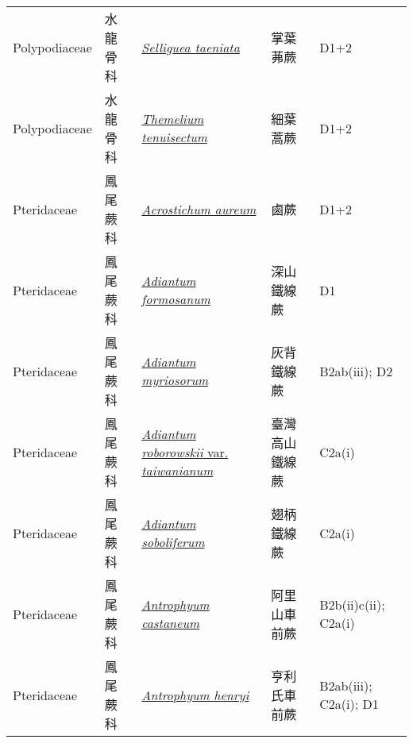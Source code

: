 {\begin{longtable}{p{2.5cm}p{2.5cm}p{4.5cm}p{2.5cm}p{3cm}}
    Polypodiaceae & 水龍骨科 & \href{http://www.theplantlist.org/tpl1.1/search?q=Selliguea+taeniata}{\textit{Selliguea taeniata} } & 掌葉茀蕨 & D1+2 \index{Selliguea@\textit{Selliguea}!taeniata@\textit{taeniata}}  \index{掌葉茀蕨} \\
    Polypodiaceae & 水龍骨科 & \href{http://www.theplantlist.org/tpl1.1/search?q=Themelium+tenuisectum}{\textit{Themelium tenuisectum} } & 細葉蒿蕨 & D1+2 \index{Themelium@\textit{Themelium}!tenuisectum@\textit{tenuisectum}}  \index{細葉蒿蕨} \\
    Pteridaceae & 鳳尾蕨科 & \href{http://www.theplantlist.org/tpl1.1/search?q=Acrostichum+aureum}{\textit{Acrostichum aureum} } & 鹵蕨 & D1+2 \index{Acrostichum@\textit{Acrostichum}!aureum@\textit{aureum}}  \index{鹵蕨} \\
    Pteridaceae & 鳳尾蕨科 & \href{http://www.theplantlist.org/tpl1.1/search?q=Adiantum+formosanum}{\textit{Adiantum formosanum} } & 深山鐵線蕨 & D1 \index{Adiantum@\textit{Adiantum}!formosanum@\textit{formosanum}}  \index{深山鐵線蕨} \\
    Pteridaceae & 鳳尾蕨科 & \href{http://www.theplantlist.org/tpl1.1/search?q=Adiantum+myriosorum}{\textit{Adiantum myriosorum} } & 灰背鐵線蕨 & B2ab(iii); D2 \index{Adiantum@\textit{Adiantum}!myriosorum@\textit{myriosorum}}  \index{灰背鐵線蕨} \\
    Pteridaceae & 鳳尾蕨科 & \href{http://www.theplantlist.org/tpl1.1/search?q=Adiantum+roborowskii+var.+taiwanianum}{\textit{Adiantum roborowskii} var. \textit{taiwanianum} } & 臺灣高山鐵線蕨 & C2a(i) \index{Adiantum@\textit{Adiantum}!roborowskii@\textit{roborowskii}!var. taiwanianum@var. \textit{taiwanianum}}  \index{臺灣高山鐵線蕨} \\
    Pteridaceae & 鳳尾蕨科 & \href{http://www.theplantlist.org/tpl1.1/search?q=Adiantum+soboliferum}{\textit{Adiantum soboliferum} } & 翅柄鐵線蕨 & C2a(i) \index{Adiantum@\textit{Adiantum}!soboliferum@\textit{soboliferum}}  \index{翅柄鐵線蕨} \\
    Pteridaceae & 鳳尾蕨科 & \href{http://www.theplantlist.org/tpl1.1/search?q=Antrophyum+castaneum}{\textit{Antrophyum castaneum} } & 阿里山車前蕨 & B2b(ii)c(ii); C2a(i) \index{Antrophyum@\textit{Antrophyum}!castaneum@\textit{castaneum}}  \index{阿里山車前蕨} \\
    Pteridaceae & 鳳尾蕨科 & \href{http://www.theplantlist.org/tpl1.1/search?q=Antrophyum+henryi}{\textit{Antrophyum henryi} } & 亨利氏車前蕨 & B2ab(iii); C2a(i); D1 \index{Antrophyum@\textit{Antrophyum}!henryi@\textit{henryi}}  \index{亨利氏車前蕨} \\

\end{longtable}}
